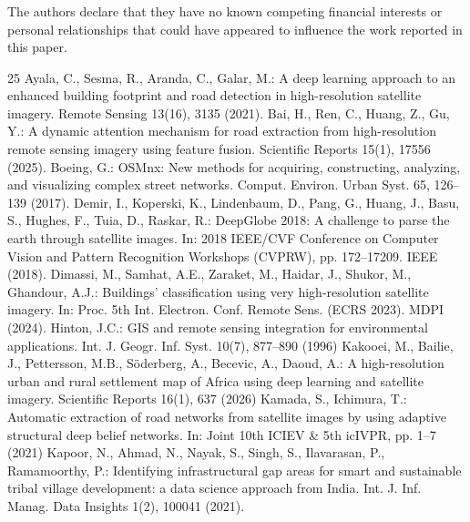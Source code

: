 \documentclass[runningheads]{llncs}
\begin{document}
\begin{credits}
\subsubsection{\discintname}
The authors declare that they have no known competing financial interests or personal relationships that could have appeared to influence the work reported in this paper.
\end{credits}

\begin{thebibliography}{25}
\footnotesize
\setlength{\itemsep}{0pt}\setlength{\parsep}{0pt}
 Ayala, C., Sesma, R., Aranda, C., Galar, M.: A deep learning approach to an enhanced building footprint and road detection in high-resolution satellite imagery. Remote Sensing 13(16), 3135 (2021). 
 Bai, H., Ren, C., Huang, Z., Gu, Y.: A dynamic attention mechanism for road extraction from high-resolution remote sensing imagery using feature fusion. Scientific Reports 15(1), 17556 (2025). 
 Boeing, G.: OSMnx: New methods for acquiring, constructing, analyzing, and visualizing complex street networks. Comput. Environ. Urban Syst. 65, 126--139 (2017). 
 Demir, I., Koperski, K., Lindenbaum, D., Pang, G., Huang, J., Basu, S., Hughes, F., Tuia, D., Raskar, R.: DeepGlobe 2018: A challenge to parse the earth through satellite images. In: 2018 IEEE/CVF Conference on Computer Vision and Pattern Recognition Workshops (CVPRW), pp. 172--17209. IEEE (2018). 
 Dimassi, M., Samhat, A.E., Zaraket, M., Haidar, J., Shukor, M., Ghandour, A.J.: Buildings' classification using very high-resolution satellite imagery. In: Proc. 5th Int. Electron. Conf. Remote Sens. (ECRS 2023). MDPI (2024). 
 Hinton, J.C.: GIS and remote sensing integration for environmental applications. Int. J. Geogr. Inf. Syst. 10(7), 877--890 (1996)
 Kakooei, M., Bailie, J., Pettersson, M.B., S\"oderberg, A., Becevic, A., Daoud, A.: A high-resolution urban and rural settlement map of Africa using deep learning and satellite imagery. Scientific Reports 16(1), 637 (2026)
 Kamada, S., Ichimura, T.: Automatic extraction of road networks from satellite images by using adaptive structural deep belief networks. In: Joint 10th ICIEV \& 5th icIVPR, pp. 1--7 (2021)
 Kapoor, N., Ahmad, N., Nayak, S., Singh, S., Ilavarasan, P., Ramamoorthy, P.: Identifying infrastructural gap areas for smart and sustainable tribal village development: a data science approach from India. Int. J. Inf. Manag. Data Insights 1(2), 100041 (2021). 

\end{thebibliography}
\end{document}
